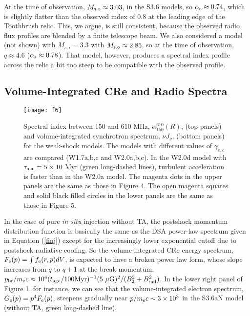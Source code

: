 \documentclass[twocolumn]{aastex61}
\def\muG{~{\mu\rm G}}
\begin{document}
At the time of observation, $M_{\rm s,o}\approx 3.03$, in the S3.6 models, so $\alpha_{\rm s}\approx 0.74$,
which is slightly flatter than the observed index of 0.8 at the leading edge of the Toothbrush relic.
This, we argue, is still consistent, because the observed radio flux profiles are blended by a finite telescope beam. 
We also considered a model (not shown) with $M_{s,i}=3.3$ with $M_{\rm s,o}\approx 2.85$, so at the time of observation, $q \approx 4.6$ ($\alpha_{\rm s} \approx 0.78$). That model, however, produces a spectral index profile across the relic
a bit too steep to be compatible with the observed profile.


\subsection{Volume-Integrated CRe and Radio Spectra}

\begin{figure*}[t]
\vspace{-0.8cm}
\hspace{-0.2cm}
\texttt{[image: f6]}
\vspace{-5.3cm}
\caption{
Spectral index between 150 and 610 MHz, $\alpha_{150}^{610} (R)$, (top panels)
and volume-integrated synchrotron spectrum, $\nu J_{\nu}$, (bottom panels) for the weak-shock models.
The models with different values of $\gamma_{e,c}$ are compared (W1.7a,b,c and W2.0a,b,c).
In the W2.0d model with $\tau_{\rm acc}=5\times10$ Myr (green long-dashed lines),
turbulent acceleration is faster than in the W2.0a model.
The magenta dots in the upper panels are the same as those in Figure 4.
The open magenta squares and solid black filled circles in the lower panels are the same as those in Figure 5.}
\label{Fig6}
\end{figure*}

In the case of pure {\it in situ} injection without TA, 
the postshock momentum distribution function is basically the same as
the DSA power-law spectrum given in Equation (\ref{finj}) 
except for the increasingly lower exponential cutoff due to postshock radiative cooling.
So the volume-integrated CRe energy spectrum, $F_{\rm e}(p)=\int f_{\rm e}(r,p) dV$,
is expected to have a broken power law form, whose slope increases from $q$ to $q+1$ 
at the break momentum, $p_{\rm br}/m_{\rm e}c \approx 10^4 (t_{\rm age}/100 {\rm Myr})^{-1}(5\muG)^2/(B_2^2+B_{\rm rad}^2)$.
In the lower right panel of Figure 1, for instance, we can see that the volume-integrated electron spectrum, $G_{\rm e}(p)=p^4 F_{\rm e}(p)$, steepens gradually near $p/m_{\rm e}c \sim 3\times 10^3$
in the S3.6aN model (without TA, green long-dashed line).
\end{document}
